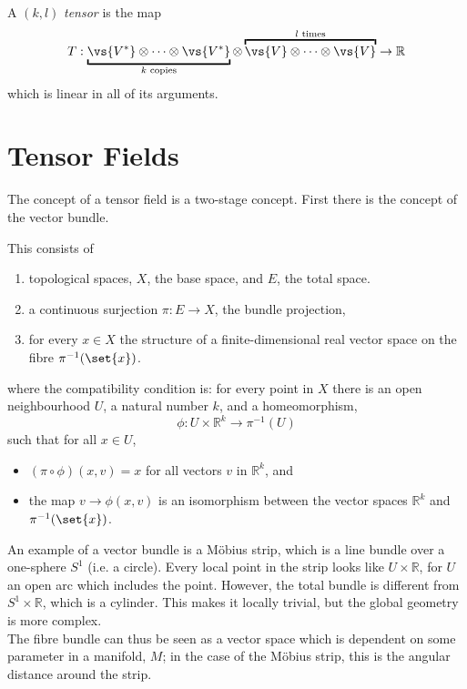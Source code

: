 \begin{definition}[Tensor]
  A $(k, l)$ \emph{tensor} is the map
  \[ T : \underbracket{ \vs{V^{*}} \otimes \cdots \otimes \vs{V^{*}}
  }_{k \text{ copies}} \otimes \overbracket{ \vs{V} \otimes \cdots
    \otimes \vs{V} }^{l \text{ times}} \to \mathbb{R}\] which is
  linear in all of its arguments.
\end{definition}

\section{Tensor Fields}
\label{sec:tensor-fields}

The concept of a tensor field is a two-stage concept. First there is the concept of the vector bundle.

\begin{definition}
  This consists of
  \begin{enumerate}
  \item topological spaces, $X$, the base space, and $E$, the total
    space.
  \item a continuous surjection $\pi : E \to X$, the bundle projection,
  \item for every $x \in X$ the structure of a finite-dimensional real vector space on the fibre $\pi^{-1}(\set{x})$.
  \end{enumerate}
  where the compatibility condition is: for every point in $X$ there
  is an open neighbourhood $U$, a natural number $k$, and a
  homeomorphism,
  \[ \phi: U \times \mathbb{R}^k \to \pi^{-1}(U) \] such that for all
  $x \in U$,
  \begin{itemize}
  \item $( \pi \circ \phi )(x,v) = x$ for all vectors $v$ in
    $\mathbb{R}^k$, and
  \item the map $v \to \phi(x,v)$ is an isomorphism between the vector
    spaces $\mathbb{R}^k$ and $\pi^{-1}(\set{x})$.
  \end{itemize}
\end{definition}

An example of a vector bundle is a M\"obius strip, which is a line
bundle over a one-sphere $S^1$ (i.e. a circle). Every local point in
the strip looks like $U \times \mathbb{R}$, for $U$ an open arc which
includes the point. However, the total bundle is different from $S^1
\times \mathbb{R}$, which is a cylinder. This makes it locally
trivial, but the global geometry is more complex.\\
The fibre bundle can thus be seen as a vector space which is dependent
on some parameter in a manifold, $M$; in the case of the M\"obius strip, this is the
angular distance around the strip.

